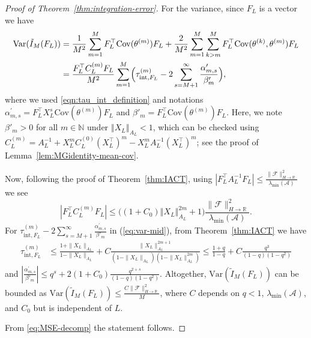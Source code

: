 \documentclass[11pt,english]{article}
\theoremstyle{plain}
\theoremstyle{plain}
\theoremstyle{plain}
\theoremstyle{plain}
\numberwithin{equation}{section}
\begin{document}
\begin{proof}[Proof of Theorem~\ref{thm:integration-error}]
	For the variance, since $F_{L}$ is a vector we have
	\begin{align}
		\mathrm{Var}(\tilde{I}_{M}(F_{L})) &                                                                                                                                                                                        %
		=\frac{1}{M^{2}}\sum_{m=1}^{M}F_{L}^{\top}\mathrm{Cov}(\theta^{(m)})F_{L}+\frac{2}{M^{2}}\sum_{m=1}^{M}\sum_{k>m}^{M}F_{L}^{\top}\mathrm{Cov}(\theta^{(k)},\theta^{(m)})F_{L}\nonumber                                      \\
		                                   & =\frac{F_{L}^{\top}C_{L}^{(m)}F_{L}}{M^{2}}\sum_{m=1}^{M}\Bigl(\tau_{\mathrm{int},F_{L}}^{(m)}-2\sum_{s=M+1}^{\infty}\frac{\alpha_{m,s}^{\prime}}{\beta'_{m}}\Bigr),\label{eq:var-mid}
	\end{align}
	where we used \eqref{eqn:tau_int_definition} and notations $\alpha_{m,s}^{\prime}=F_{L}^{\top}X_{L}^{s}\mathrm{Cov}(\theta^{(m)})F_{L}$
	and $\beta'_{m}=F_{L}^{\top}\mathrm{Cov}(\theta^{(m)})F_{L}$. Here,
	we note $\beta'_{m}>0$ for all $m\in\mathbb{N}$ under $\left\Vert X_{L}\right\Vert _{A_{L}}<1$,
	which can be checked using $C_{L}^{(m)}=A_{L}^{-1}+X_{L}^{m}C_{L}^{(0)}(X_{L}^{\top})^{m}-X_{L}^{m}A_{L}^{-1}(X_{L}^{\top})^{m}$;
	see the proof of Lemma~\ref{lem:MGidentity-mean-cov}.

	Now, following the proof of Theorem~\ref{thm:IACT},
	using $|F_{L}^{\top}A_{L}^{-1}F_{L}|\leq\frac{\|\mathcal{F}\|_{H\rightarrow\mathbb{R}}^{2}}{\lambda_{\min}(\mathcal{A})}$ we see
	\[
		|F_{L}^{\top}C_{L}^{(m)}F_{L}|\leq\biggl(\left(1+C_{0}\right)\left\Vert X_{L}\right\Vert _{A_{L}}^{2m}+1\biggr)\frac{\|\mathcal{F}\|_{H\rightarrow\mathbb{R}}^{2}}{\lambda_{\min}(\mathcal{A})}.
	\]
	For $\tau_{\mathrm{int},F_{L}}^{(m)}-2\sum_{s=M+1}^{\infty}\frac{\alpha_{m,s}^{\prime}}{\beta'_{m}}$
	in (\ref{eq:var-mid}), from Theorem~\ref{thm:IACT} we have
	\begin{align*}
		\tau_{\mathrm{int},F_{L}}^{(m)} & \leq\frac{1+\|X_{L}\|_{A_{L}}}{1-\|X_{L}\|_{A_{L}}}+C\frac{\|X_{L}\|_{A_{L}}^{2m+1}}{(1-\|X_{L}\|_{A_{L}})(1-\|X_{L}\|_{A_{L}}^{2m})}  \leq\frac{1+q}{1-q}+C\frac{q^{3}}{(1-q)(1-q^{2})}
	\end{align*}
	and $\left|\frac{\alpha_{m,s}^{\prime}}{\beta'_{m}}\right|\leq q^{s}+2(1+C_{0})\frac{q^{2+s}}{(1-q)(1-q^{2})}.$
	Altogether, $\mathrm{Var}(\tilde{I}_{M}(F_{L}))$ can be bounded as
	$\mathrm{Var}(\tilde{I}_{M}(F_{L}))\leq\frac{C\|\mathcal{F}\|_{H\rightarrow\mathbb{R}}^{2}}{M}$,
	where $C$ depends on $q<1$, $\lambda_{\min}(\mathcal{A})$, and
	$C_{0}$ but is independent of $L$.

	From \eqref{eq:MSE-decomp} the statement follows.
\end{proof}
\end{document}
